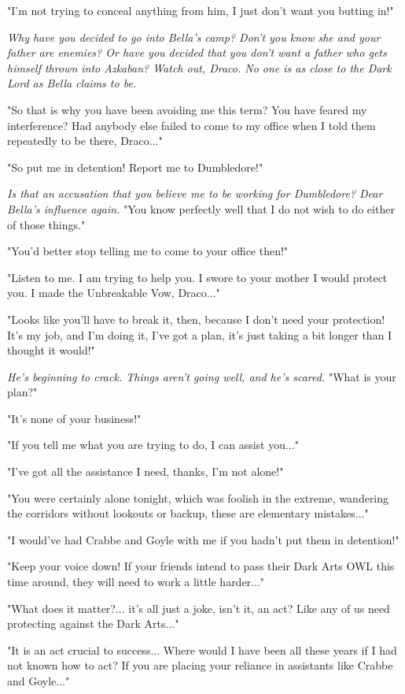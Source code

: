 \documentclass[a4paper,11pt]{article}
\begin{document}
"I'm not trying to conceal anything from him, I just don't want you butting in!"

\emph{Why have you decided to go into Bella's camp? Don't you know she and your father are enemies? Or have you decided that you don't want a father who gets himself thrown into Azkaban? Watch out, Draco. No one is as close to the Dark Lord as Bella claims to be.}

"So that is why you have been avoiding me this term? You have feared my interference? Had anybody else failed to come to my office when I told them repeatedly to be there, Draco..."

"So put me in detention! Report me to Dumbledore!"

\emph{Is that an accusation that you believe me to be working for Dumbledore? Dear Bella's influence again.} "You know perfectly well that I do not wish to do either of those things."

"You'd better stop telling me to come to your office then!"

"Listen to me. I am trying to help you. I swore to your mother I would protect you. I made the Unbreakable Vow, Draco..."

"Looks like you'll have to break it, then, because I don't need your protection! It's my job, and I'm doing it, I've got a plan, it's just taking a bit longer than I thought it would!"

\emph{He's beginning to crack. Things aren't going well, and he's scared.} "What is your plan?"

"It's none of your business!"

"If you tell me what you are trying to do, I can assist you..."

"I've got all the assistance I need, thanks, I'm not alone!"

"You were certainly alone tonight, which was foolish in the extreme, wandering the corridors without lookouts or backup, these are elementary mistakes..."

"I would've had Crabbe and Goyle with me if you hadn't put them in detention!"

"Keep your voice down! If your friends intend to pass their Dark Arts OWL this time around, they will need to work a little harder..."

"What does it matter?... it's all just a joke, isn't it, an act? Like any of us need protecting against the Dark Arts..."

"It is an act crucial to success... Where would I have been all these years if I had not known how to act? If you are placing your reliance in assistants like Crabbe and Goyle..."
\end{document}
